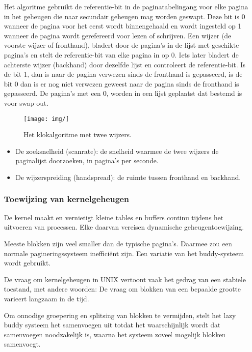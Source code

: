 Het algoritme gebruikt de referentie-bit in de paginatabelingang voor elke pagina in het geheugen die naar secundair geheugen mag worden geswapt. Deze bit is 0 wanneer de pagina voor het eerst wordt binnengehaald en wordt ingesteld op 1 wanneer de pagina wordt gerefereerd voor lezen of schrijven. Een wijzer (de voorste wijzer of fronthand), bladert door de pagina’s in de lijst met geschikte pagina’s en stelt de referentie-bit van elke pagina in op 0. Iets later bladert de achterste wijzer (backhand) door dezelfde lijst en controleert de referentie-bit. Is de bit 1, dan is naar de pagina verwezen sinds de fronthand is gepasseerd, is de bit 0 dan is er nog niet verwezen geweest naar de pagina sinds de fronthand is gepasseerd. De pagina’s met een 0, worden in een lijst geplaatst dat bestemd is voor swap-out.

\begin{figure}[htp]
    \centering
            \texttt{[image: img/]}
        \caption{Het klokalgoritme met twee wijzers.}
    \label{fig:Het klokalgoritme met twee wijzers.}
\end{figure}


\begin{itemize}
\item De zoeksnelheid (scanrate): de snelheid waarmee de twee wijzers de paginalijst doorzoeken, in pagina’s per seconde.
\item De wijzerspreiding (handspread): de ruimte tussen fronthand en backhand.
\end{itemize}


\subsubsection{Toewijzing van kernelgeheugen}

De kernel maakt en vernietigt kleine tables en buffers continu tijdens het uitvoeren van processen. Elke daarvan vereisen dynamische geheugentoewijzing.

Meeste blokken zijn veel smaller dan de typische pagina’s. Daarmee zou een normale pagineringssysteem inefficiënt zijn. Een variatie van het buddy-systeem wordt gebruikt.

De vraag om kernelgeheugen in UNIX vertoont vaak het gedrag van een stabiele toestand, met andere woorden: De vraag om blokken van een bepaalde grootte varieert langzaam in de tijd.

Om onnodige groepering en splitsing van blokken te vermijden, stelt het lazy buddy systeem het samenvoegen uit totdat het waarschijnlijk wordt dat samenvoegen noodzakelijk is, waarna het systeem zoveel mogelijk blokken samenvoegt.

